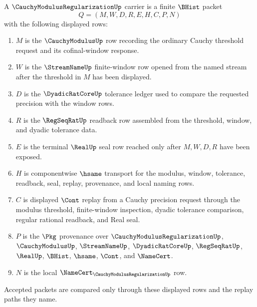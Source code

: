 \begin{definition}
\label{def:cauchy-modulus-regularization-carrier}
A $\CauchyModulusRegularizationUp$ carrier is a finite $\BHist$ packet
$$
Q=(M,W,D,R,E,H,C,P,N)
$$
with the following displayed rows:
\begin{enumerate}
\item $M$ is the $\CauchyModulusUp$ row recording the ordinary Cauchy threshold request and its cofinal-window response.
\item $W$ is the $\StreamNameUp$ finite-window row opened from the named stream after the threshold in $M$ has been displayed.
\item $D$ is the $\DyadicRatCoreUp$ tolerance ledger used to compare the requested precision with the window rows.
\item $R$ is the $\RegSeqRatUp$ readback row assembled from the threshold, window, and dyadic tolerance data.
\item $E$ is the terminal $\RealUp$ seal row reached only after $M,W,D,R$ have been exposed.
\item $H$ is componentwise $\hsame$ transport for the modulus, window, tolerance, readback, seal, replay, provenance, and local naming rows.
\item $C$ is displayed $\Cont$ replay from a Cauchy precision request through the modulus threshold, finite-window inspection, dyadic tolerance comparison, regular rational readback, and Real seal.
\item $P$ is the $\Pkg$ provenance over $\CauchyModulusRegularizationUp$, $\CauchyModulusUp$, $\StreamNameUp$, $\DyadicRatCoreUp$, $\RegSeqRatUp$, $\RealUp$, $\BHist$, $\hsame$, $\Cont$, and $\NameCert$.
\item $N$ is the local $\NameCert_{\CauchyModulusRegularizationUp}$ row.
\end{enumerate}
Accepted packets are compared only through these displayed rows and the replay paths they name.
\end{definition}


